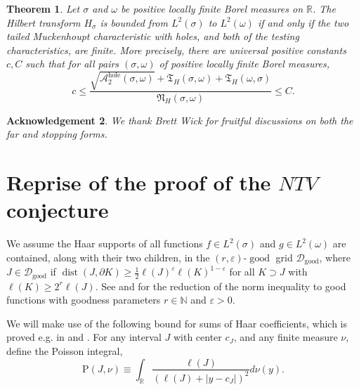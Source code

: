 \documentclass{amsart}%
\newtheorem{theorem}{Theorem}
\theoremstyle{plain}
\newtheorem{acknowledgement}[theorem]{Acknowledgement}
\numberwithin{equation}{section}
\begin{document}
\begin{theorem}
\label{main}Let $\sigma$ and $\omega$ be positive locally finite Borel
measures on $\mathbb{R}$. The Hilbert transform $H_{\sigma}$ is bounded from
$L^{2}\left(  \sigma\right)  $ to $L^{2}\left(  \omega\right)  $ \emph{if and
only if} the two tailed Muckenhoupt characteristic with holes, and both of the
testing characteristics, are finite. More precisely, there are universal
positive constants $c,C$ such that for all pairs $\left(  \sigma
,\omega\right)  $ of positive locally finite Borel measures,
\[
c\leq\frac{\sqrt{\mathcal{A}_{2}^{\operatorname{hole}}\left(  \sigma
,\omega\right)  }+\mathfrak{T}_{H}\left(  \sigma,\omega\right)  +\mathfrak{T}%
_{H}\left(  \omega,\sigma\right)  }{\mathfrak{N}_{H}\left(  \sigma
,\omega\right)  }\leq C.
\]

\end{theorem}

\begin{acknowledgement}
We thank Brett Wick for fruitful discussions on both the far and stopping forms.
\end{acknowledgement}

\section{Reprise of the proof of the $NTV$ conjecture}

We assume the Haar supports of all functions $f\in L^{2}\left(  \sigma\right)
$ and $g\in L^{2}\left(  \omega\right)  $ are contained, along with their two
children, in the $\left(  r,\varepsilon\right)  $-$\operatorname{good}$ grid
$\mathcal{D}_{\operatorname{good}}$, where $J\in\mathcal{D}%
_{\operatorname{good}}$ if $\operatorname*{dist}\left(  J,\partial K\right)
\geq\frac{1}{2}\ell\left(  J\right)  ^{\varepsilon}\ell\left(  K\right)
^{1-\varepsilon}$ for all $K\supset J$ with $\ell\left(  K\right)  \geq
2^{r}\ell\left(  J\right)  $. See \cite{NTV3} and \cite{LaSaShUr3} for the
reduction of the norm inequality to good functions with goodness parameters
$r\in\mathbb{N}$ and $\varepsilon>0 $.

We will make use of the following bound for sums of Haar coefficients, which
is proved e.g. in \cite{LaSaUr2} and \cite{LaSaShUr3}. For any interval $J$
with center $c_{J}$, and any finite measure $\nu$, define the Poisson
integral,%
\[
\mathrm{P}\left(  J,\nu\right)  \equiv\int_{\mathbb{R}}\frac{\ell\left(
J\right)  }{\left(  \ell\left(  J\right)  +\left\vert y-c_{J}\right\vert
\right)  ^{2}}d\nu\left(  y\right)  .
\]
\end{document}
